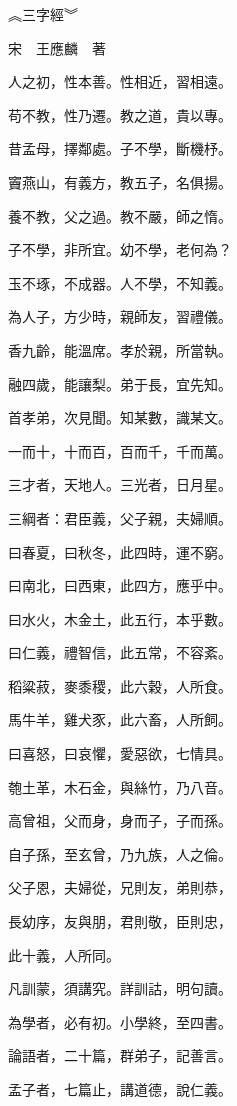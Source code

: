 \documentclass[20pt,a4paper]{article}
\begin{document}
\begin{Huge}
︽三字經︾

宋　王應麟　著
\\

\end{Huge}
\begin{huge}
人之初，性本善。性相近，習相遠。

苟不教，性乃遷。教之道，貴以專。

昔孟母，擇鄰處。子不學，斷機杼。

竇燕山，有義方，教五子，名俱揚。

養不教，父之過。教不嚴，師之惰。

子不學，非所宜。幼不學，老何為？

玉不琢，不成器。人不學，不知義。

為人子，方少時，親師友，習禮儀。

香九齡，能溫席。孝於親，所當執。

融四歲，能讓梨。弟于長，宜先知。
\newpage

首孝弟，次見聞。知某數，識某文。

一而十，十而百，百而千，千而萬。

三才者，天地人。三光者，日月星。

三綱者：君臣義，父子親，夫婦順。

曰春夏，曰秋冬，此四時，運不窮。

曰南北，曰西東，此四方，應乎中。

曰水火，木金土，此五行，本乎數。

曰仁義，禮智信，此五常，不容紊。

稻粱菽，麥黍稷，此六穀，人所食。

馬牛羊，雞犬豕，此六畜，人所飼。

曰喜怒，曰哀懼，愛惡欲，七情具。

匏土革，木石金，與絲竹，乃八音。

高曾祖，父而身，身而子，子而孫。

自子孫，至玄曾，乃九族，人之倫。

父子恩，夫婦從，兄則友，弟則恭，

長幼序，友與朋，君則敬，臣則忠，

此十義，人所同。
\newpage

凡訓蒙，須講究。詳訓詁，明句讀。

為學者，必有初。小學終，至四書。

論語者，二十篇，群弟子，記善言。

孟子者，七篇止，講道德，說仁義。


\end{huge}
\end{document}
